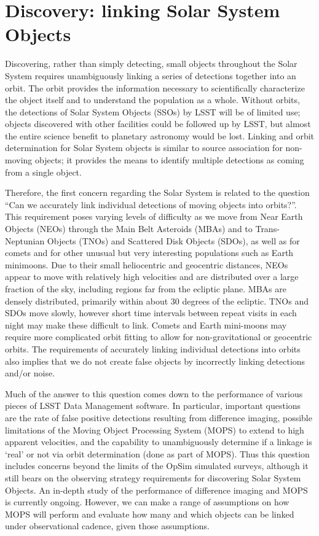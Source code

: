 
\section{Discovery: linking Solar System Objects}
\def\secname{\chpname:discovery}\label{sec:\secname}

Discovering, rather than simply detecting, small objects throughout
the Solar System requires unambiguously linking a series of detections
together into an orbit. The orbit provides the information necessary
to scientifically characterize the object itself and to understand the
population as a whole. Without orbits, the detections of Solar System
Objects (SSOs) by LSST will be of limited use; objects discovered with
other facilities could be followed up by LSST, but almost the entire
science benefit to planetary astronomy would be lost. Linking and
orbit determination for Solar System objects is similar to source
association for non-moving objects; it provides the means to identify
multiple detections as coming from a single object.

Therefore, the first concern regarding the Solar System is related
to the question ``Can we accurately link individual detections of moving objects into
orbits?''.  This requirement poses varying levels of difficulty as we
move from Near Earth Objects (NEOs) through the Main Belt Asteroids
(MBAs) and to Trans-Neptunian Objects (TNOs) and Scattered Disk Objects
(SDOs), as well as for comets and for other unusual but very
interesting populations such as Earth minimoons. Due to their small
heliocentric and geocentric distances, NEOs appear to move with
relatively high velocities and are distributed over a large fraction
of the sky, including regions far from the ecliptic plane. MBAs are densely distributed,
primarily within about 30 degrees of the ecliptic. TNOs and SDOs move
slowly, however short time intervals between repeat visits in each night may make these difficult
to link. Comets and Earth mini-moons may require more complicated
orbit fitting to allow for non-gravitational or geocentric
orbits. The requirements of accurately linking individual detections
into orbits also implies that we do not create false objects by
incorrectly linking detections and/or noise.

Much of the answer to this question comes down to the performance of
various pieces of LSST Data Management software. In particular,
important questions are the
rate of false positive detections resulting from difference imaging, possible
limitations of the Moving Object Processing System (MOPS) to extend to high
apparent velocities, and the capability to unambiguously determine if
a linkage is `real' or not via orbit determination (done as part of
MOPS). Thus this question includes concerns beyond the limits of the OpSim simulated
surveys, although it still bears on the observing strategy requirements for
discovering Solar System Objects. An in-depth study of the performance
of difference imaging and MOPS is currently ongoing. However, we can
make a range of assumptions on how MOPS will perform and evaluate how
many and which objects can be linked under observational cadence, given those assumptions.


